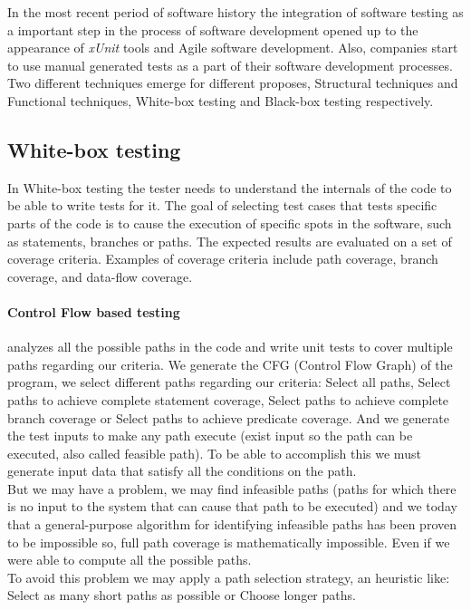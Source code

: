 \documentclass[citeauthoryear]{llncs}
\newcommand{\xunit}{\textit{xUnit}}
\begin{document}
In the most recent period of software history the integration of software testing as a important step in the process of
software development opened up to the appearance of \xunit\cite{xunit} tools and Agile software development.
Also, companies start to use manual generated tests as a part of their software development processes.\\
Two different techniques emerge for different proposes, Structural techniques and Functional techniques,
White-box testing and Black-box\cite{black} testing respectively.

\subsection{White-box testing}
In White-box testing the tester needs to understand the internals of the code to be able to write tests for it.
The goal of selecting test cases that tests specific parts of the code is to cause the execution of specific spots in the software, such as statements, branches or
paths. The expected results are evaluated on a set of coverage criteria. Examples of coverage criteria include path coverage, branch coverage, and data-flow coverage.
\paragraph{Control Flow based testing} analyzes all the possible paths in the code and write unit tests to cover multiple paths regarding our criteria.
We generate the CFG (Control Flow Graph) of the program, we select different paths regarding our criteria:
Select all paths, Select paths to achieve complete statement coverage\cite{stt,Ntafos:1988:CST:630792.631017},
Select paths to achieve complete branch coverage\cite{Roper1994,stt}
or Select paths to achieve predicate coverage\cite{stt,Ntafos:1988:CST:630792.631017}.
And we generate the test inputs to make any path execute (exist input so the path can be executed, also called feasible path).
To be able to accomplish this we must generate input data that satisfy all the conditions on the path.\\
But we may have a problem, we may find infeasible paths (paths for which there is no input to the system that can cause that path to be executed)
and we today that a general-purpose algorithm for identifying infeasible paths has been proven to be impossible\cite{infeasible} so, full path coverage
is mathematically impossible. Even if we were able to compute all the possible paths.\\
To avoid this problem we may apply a path selection strategy, an heuristic like: Select as many short paths as possible or Choose longer paths.
\end{document}
